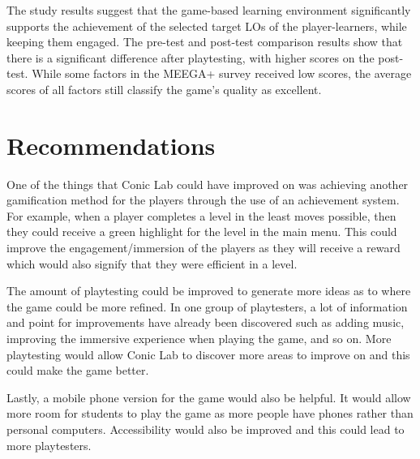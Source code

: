 The study results suggest that the game-based learning environment significantly supports the achievement of the selected target LOs of the player-learners, while keeping them engaged. The pre-test and post-test comparison results show that there is a significant difference after playtesting, with higher scores on the post-test. While some factors in the MEEGA+ survey received low scores, the average scores of all factors still classify the game's quality as excellent.

\section{Recommendations}
\label{sec:recommendations}
One of the things that Conic Lab could have improved on was achieving another gamification method for the players through the use of an achievement system. For example, when a player completes a level in the least moves possible, then they could receive a green highlight for the level in the main menu. This could improve the engagement/immersion of the players as they will receive a reward which would also signify that they were efficient in a level. 

The amount of playtesting could be improved to generate more ideas as to where the game could be more refined. In one group of playtesters, a lot of information and point for improvements have already been discovered such as adding music, improving the immersive experience when playing the game, and so on. More playtesting would allow Conic Lab to discover more areas to improve on and this could make the game better.

Lastly, a mobile phone version for the game would also be helpful. It would allow more room for students to play the game as more people have phones rather than personal computers. Accessibility would also be improved and this could lead to more playtesters.







